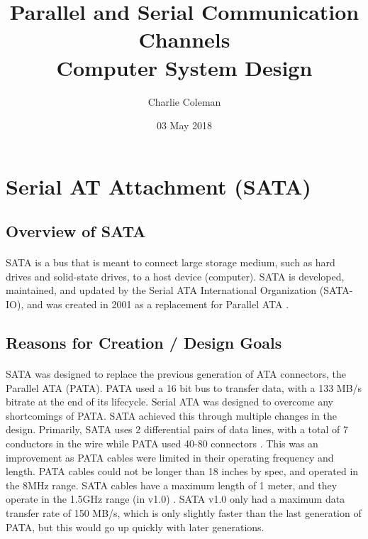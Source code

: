 \documentclass{article}
\title{\textbf{Parallel and Serial Communication Channels\\ Computer System Design}}
\author{Charlie Coleman}
\date{03 May 2018}
\begin{document}
	\begin{titlingpage}
	\maketitle
	\end{titlingpage}
	
	\section{Serial AT Attachment (SATA)}
	
	\subsection{Overview of SATA} 
	\paragraph{} SATA is a bus that is meant to connect large storage medium, such as hard drives and solid-state drives, to a host device (computer). SATA is developed, maintained, and updated by the Serial ATA International Organization (SATA-IO), and was created in 2001 as a replacement for Parallel ATA \cite{satarev1}.
	
	\subsection{Reasons for Creation / Design Goals} 
	
	\paragraph{} SATA was designed to replace the previous generation of ATA connectors, the Parallel ATA (PATA). PATA used a 16 bit bus to transfer data, with a 133 MB/s bitrate at the end of its lifecycle. Serial ATA was designed to overcome any shortcomings of PATA. SATA achieved this through multiple changes in the design. Primarily, SATA uses 2 differential pairs of data lines, with a total of 7 conductors in the wire while PATA used 40-80 connectors \cite{pataspec}. This was an improvement as PATA cables were limited in their operating frequency and length. PATA cables could not be longer than 18 inches by spec, and operated in the 8MHz range. SATA cables have a maximum length of 1 meter, and they operate in the 1.5GHz range (in v1.0) \cite{satarev1a}. SATA v1.0 only had a maximum data transfer rate of 150 MB/s, which is only slightly faster than the last generation of PATA, but this would go up quickly with later generations.
\end{document}
